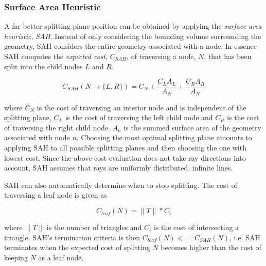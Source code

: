 \subsubsection{Surface Area Heuristic}\label{sec:SAH}



A far better splitting plane position can be obtained by applying the
\textit{surface area heuristic}, \textit{SAH}. Instead of only
considering the bounding volume surrounding the geometry, SAH
considers the entire geometry associated with a node. In essence SAH
computes the \textit{expected cost}, $C_{SAH}$, of traversing a node,
$N$, that has been split into the child nodes $L$ and $R$.

\begin{displaymath}
  C_{SAH}(N \rightarrow \{L, R\}) = C_N + \frac{C_L A_L}{A_N} +
  \frac{C_R A_R}{A_N}
\end{displaymath}

where $C_N$ is the cost of traversing an interior node and is
independent of the splitting plane, $C_L$ is the cost of traversing
the left child node and $C_R$ is the cost of traversing the right
child node. $A_n$ is the summed surface area of the geometry
associated with node $n$. Choosing the most optimal splitting plane
amounts to applying SAH to all possible splitting planes and then
choosing the one with lowest cost. Since the above cost evaluation
does not take ray directions into account, SAH assumes that rays are
uniformly distributed, infinite lines.


SAH can also automatically determine when to stop splitting. The cost
of traversing a leaf node is given as

\begin{displaymath}
  C_{leaf}(N) = \|T\| * C_i
\end{displaymath}

where $\|T\|$ is the number of triangles and $C_i$ is the cost of
intersecting a triangle. SAH's termination criteria is then
$C_{leaf}(N) <= C_{SAH}(N)$, i.e. SAH terminates when the expected
cost of splitting $N$ becomes higher than the cost of keeping $N$ as a
leaf node.

